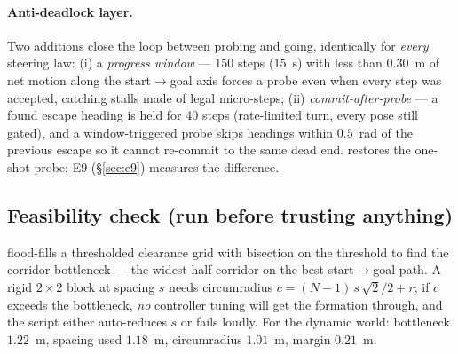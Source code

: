 \paragraph{Anti-deadlock layer.} Two additions close the loop between
probing and going, identically for \emph{every} steering law: (i) a
\emph{progress window} --- $150$ steps ($15$~s) with less than $0.30$~m of
net motion along the start$\to$goal axis forces a probe even when every
step was accepted, catching stalls made of legal micro-steps; (ii)
\emph{commit-after-probe} --- a found escape heading is held for $40$ steps
(rate-limited turn, every pose still gated), and a window-triggered probe
skips headings within $0.5$~rad of the previous escape so it cannot
re-commit to the same dead end.  restores the
one-shot probe; E9 (\S\ref{sec:e9}) measures the difference.

\subsection{Feasibility check (run before trusting anything)}

 flood-fills a thresholded clearance grid with
bisection on the threshold to find the corridor bottleneck --- the widest
half-corridor on the best start$\to$goal path. A rigid $2\times2$ block at
spacing $s$ needs circumradius
$c = (N-1)\,s\,\sqrt{2}/2 + r$; if $c$ exceeds the bottleneck, \emph{no}
controller tuning will get the formation through, and the script either
auto-reduces $s$ or fails loudly. For the dynamic world: bottleneck
$1.22$~m, spacing used $1.18$~m, circumradius $1.01$~m, margin $0.21$~m.
